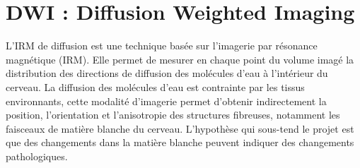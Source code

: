 \section{DWI : Diffusion Weighted Imaging} \label{sec:dwi}

L'IRM de diffusion est une technique basée sur l'imagerie par résonance magnétique (IRM).
Elle permet de mesurer en chaque point du volume imagé la distribution des directions de diffusion des molécules d'eau à l'intérieur du cerveau.
La diffusion des molécules d'eau est contrainte par les tissus environnants, cette modalité d'imagerie permet d'obtenir indirectement la position, l'orientation et l'anisotropie des structures fibreuses, notamment les faisceaux de matière blanche du cerveau.
L'hypothèse qui sous-tend le projet est que des changements dans la matière blanche peuvent indiquer des changements pathologiques.
